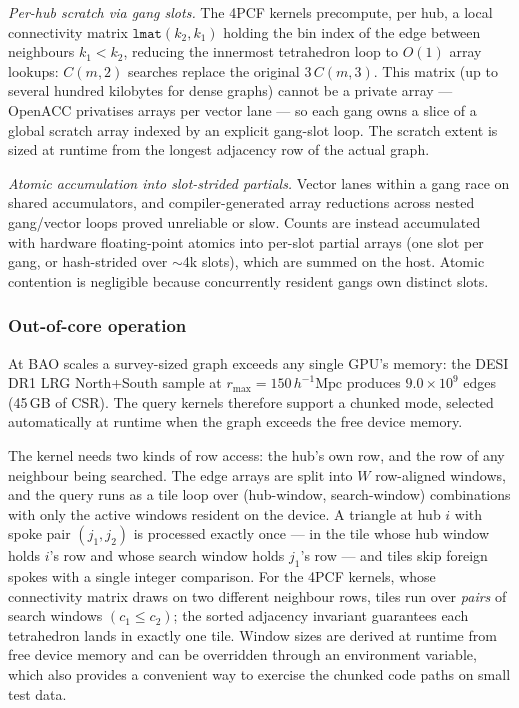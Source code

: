 \documentclass[twocolumn]{aastex701}
\newcommand{\rmax}{r_{\mathrm{max}}}
\newcommand{\Mpch}{\,h^{-1}\mathrm{Mpc}}
\begin{document}
\textit{Per-hub scratch via gang slots.}  The 4PCF kernels precompute, per
hub, a local connectivity matrix $\mathtt{lmat}(k_2,k_1)$ holding the bin
index of the edge between neighbours $k_1<k_2$, reducing the innermost
tetrahedron loop to $O(1)$ array lookups: $C(m,2)$ searches replace the
original $3\,C(m,3)$.  This matrix (up to several hundred kilobytes for
dense graphs) cannot be a private array --- OpenACC privatises arrays per
vector lane --- so each gang owns a slice of a global scratch array indexed
by an explicit gang-slot loop.  The scratch extent is sized at runtime from
the longest adjacency row of the actual graph.

\textit{Atomic accumulation into slot-strided partials.}  Vector lanes
within a gang race on shared accumulators, and compiler-generated array
reductions across nested gang/vector loops proved unreliable or slow.
Counts are instead accumulated with hardware floating-point atomics into
per-slot partial arrays (one slot per gang, or hash-strided over $\sim$4k
slots), which are summed on the host.  Atomic contention is negligible
because concurrently resident gangs own distinct slots.

\subsubsection{Out-of-core operation}
\label{sec:chunking}

At BAO scales a survey-sized graph exceeds any single GPU's memory: the
DESI DR1 LRG North+South sample at $\rmax = 150\Mpch$ produces
$9.0\times10^9$ edges (45\,GB of CSR).  The query kernels therefore
support a chunked mode, selected automatically at runtime when the graph
exceeds the free device memory.

The kernel needs two kinds of row access: the hub's own row, and the row
of any neighbour being searched.  The edge arrays are split into $W$
row-aligned windows, and the query runs as a tile loop over (hub-window,
search-window) combinations with only the active windows resident on the
device.  A triangle at hub $i$ with spoke pair $(j_1, j_2)$ is processed
exactly once --- in the tile whose hub window holds $i$'s row and whose
search window holds $j_1$'s row --- and tiles skip foreign spokes with a
single integer comparison.  For the 4PCF kernels, whose connectivity
matrix draws on two different neighbour rows, tiles run over \emph{pairs}
of search windows $(c_1 \le c_2)$; the sorted adjacency invariant
guarantees each tetrahedron lands in exactly one tile.  Window sizes are
derived at runtime from free device memory and can be overridden through
an environment variable, which also provides a convenient way to exercise
the chunked code paths on small test data.
\end{document}
